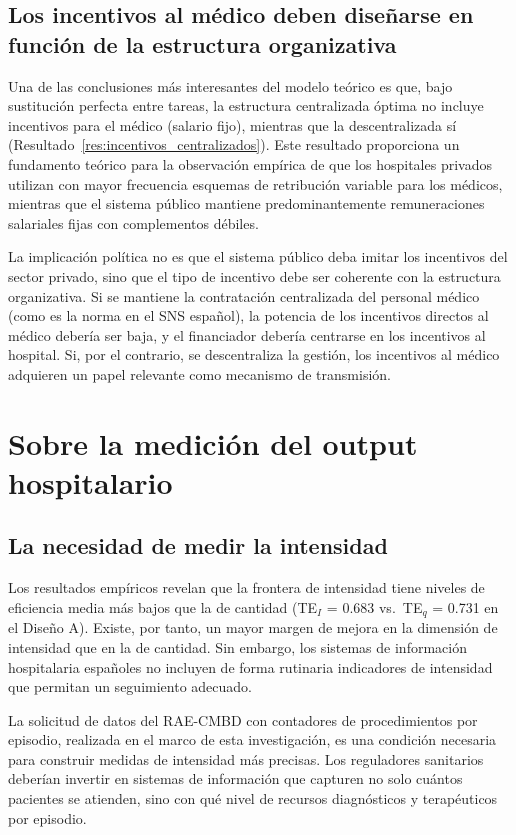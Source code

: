 \documentclass[12pt, a4paper, twoside, openright]{book}
\theoremstyle{plain}
\theoremstyle{definition}
\theoremstyle{remark}
\begin{document}
\subsection{Los incentivos al médico deben diseñarse en función de la estructura organizativa}

Una de las conclusiones más interesantes del modelo teórico es que, bajo sustitución perfecta entre tareas, la estructura centralizada óptima no incluye incentivos para el médico (salario fijo), mientras que la descentralizada sí (Resultado~\ref{res:incentivos_centralizados}). Este resultado proporciona un fundamento teórico para la observación empírica de que los hospitales privados utilizan con mayor frecuencia esquemas de retribución variable para los médicos, mientras que el sistema público mantiene predominantemente remuneraciones salariales fijas con complementos débiles.

La implicación política no es que el sistema público deba imitar los incentivos del sector privado, sino que el tipo de incentivo debe ser coherente con la estructura organizativa. Si se mantiene la contratación centralizada del personal médico (como es la norma en el SNS español), la potencia de los incentivos directos al médico debería ser baja, y el financiador debería centrarse en los incentivos al hospital. Si, por el contrario, se descentraliza la gestión, los incentivos al médico adquieren un papel relevante como mecanismo de transmisión.

\section{Sobre la medición del output hospitalario}

\subsection{La necesidad de medir la intensidad}

Los resultados empíricos revelan que la frontera de intensidad tiene niveles de eficiencia media más bajos que la de cantidad (TE$_I$ = 0.683 vs.\ TE$_q$ = 0.731 en el Diseño A). Existe, por tanto, un mayor margen de mejora en la dimensión de intensidad que en la de cantidad. Sin embargo, los sistemas de información hospitalaria españoles no incluyen de forma rutinaria indicadores de intensidad que permitan un seguimiento adecuado.

La solicitud de datos del RAE-CMBD con contadores de procedimientos por episodio, realizada en el marco de esta investigación, es una condición necesaria para construir medidas de intensidad más precisas. Los reguladores sanitarios deberían invertir en sistemas de información que capturen no solo cuántos pacientes se atienden, sino con qué nivel de recursos diagnósticos y terapéuticos por episodio.
\end{document}
